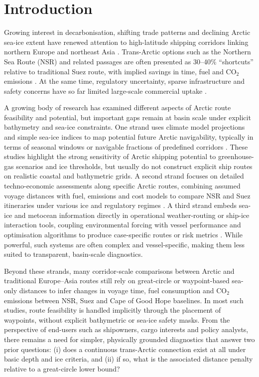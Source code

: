 \section{Introduction}\label{sec:introduction}

Growing interest in decarbonisation, shifting trade patterns and declining Arctic sea-ice extent have renewed attention to high-latitude shipping corridors linking northern Europe and northeast Asia \citep{Stroeve2012,Notz2016}. Trans-Arctic options such as the Northern Sea Route (NSR) and related passages are often presented as 30--40\% ``shortcuts'' relative to traditional Suez route, with implied savings in time, fuel and \(\mathrm{CO_2}\) emissions \citep{Melia2016}. At the same time, regulatory uncertainty, sparse infrastructure and safety concerns have so far limited large-scale commercial uptake \citep{Stephenson2013,Chen2021TC}.

A growing body of research has examined different aspects of Arctic route feasibility and potential, but important gaps remain at basin scale under explicit bathymetry and sea-ice constraints. One strand uses climate model projections and simple sea-ice indices to map potential future Arctic navigability, typically in terms of seasonal windows or navigable fractions of predefined corridors \citep{Stephenson2013,Melia2016,Aksenov2017,Chen2021TC,Zhang2023JMSE}. These studies highlight the strong sensitivity of Arctic shipping potential to greenhouse-gas scenarios and ice thresholds, but usually do not construct explicit ship routes on realistic coastal and bathymetric grids. A second strand focuses on detailed techno-economic assessments along specific Arctic routes, combining assumed voyage distances with fuel, emissions and cost models to compare NSR and Suez itineraries under various ice and regulatory regimes \citep{Zhu2018,Pruyn2022}. A third strand embeds sea-ice and metocean information directly in operational weather-routing or ship-ice interaction tools, coupling environmental forcing with vessel performance and optimisation algorithms to produce case-specific routes or risk metrics \citep{Kuuliala2017,Lu2021,Liu2023}. While powerful, such systems are often complex and vessel-specific, making them less suited to transparent, basin-scale diagnostics.


Beyond these strands, many corridor-scale comparisons between Arctic and traditional Europe--Asia routes still rely on great-circle or waypoint-based sea-only distances to infer changes in voyage time, fuel consumption and \(\mathrm{CO_2}\) emissions between NSR, Suez and Cape of Good Hope baselines. In most such studies, route feasibility is handled implicitly through the placement of waypoints, without explicit bathymetric or sea-ice safety masks. From the perspective of end-users such as shipowners, cargo interests and policy analysts, there remains a need for simpler, physically grounded diagnostics that answer two prior questions: (i) does a continuous trans-Arctic connection exist at all under basic depth and ice criteria, and (ii) if so, what is the associated distance penalty relative to a great-circle lower bound?

